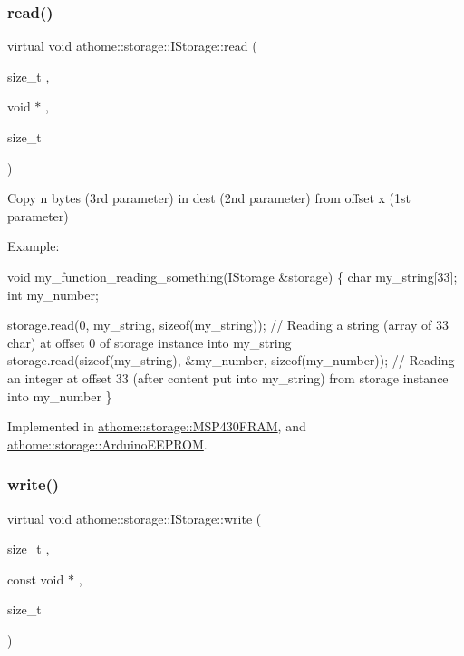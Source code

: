 \subsubsection{\texorpdfstring{read()}{read()}}
{\footnotesize\ttfamily virtual void athome\+::storage\+::\+I\+Storage\+::read (\begin{DoxyParamCaption}\item[{size\+\_\+t}]{,  }\item[{void $\ast$}]{,  }\item[{size\+\_\+t}]{ }\end{DoxyParamCaption})\hspace{0.3cm}{\ttfamily [pure virtual]}}

Copy n bytes (3rd parameter) in dest (2nd parameter) from offset x (1st parameter)

Example\+:


\begin{DoxyCode}
\textcolor{keywordtype}{void} my\_function\_reading\_something(IStorage &storage) \{
  \textcolor{keywordtype}{char} my\_string[33];
  \textcolor{keywordtype}{int} my\_number;

  storage.read(0, my\_string, \textcolor{keyword}{sizeof}(my\_string)); \textcolor{comment}{// Reading a string (array}
of 33 char) at offset 0 of storage instance into my\_string
  storage.read(\textcolor{keyword}{sizeof}(my\_string), &my\_number, \textcolor{keyword}{sizeof}(my\_number)); \textcolor{comment}{//}
Reading an integer at offset 33 (after content put into my\_string) from
storage instance into my\_number
\}
\end{DoxyCode}
 

Implemented in \mbox{\hyperlink{classathome_1_1storage_1_1_m_s_p430_f_r_a_m_a3a00a26565491d08d26f505930453fb7}{athome\+::storage\+::\+M\+S\+P430\+F\+R\+AM}}, and \mbox{\hyperlink{classathome_1_1storage_1_1_arduino_e_e_p_r_o_m_a853674189981dd3395ea76911d2eb1a0}{athome\+::storage\+::\+Arduino\+E\+E\+P\+R\+OM}}.

\mbox{\label{classathome_1_1storage_1_1_i_storage_a1017bb6ad438313b98197893954e52f1}} 
\subsubsection{\texorpdfstring{write()}{write()}}
{\footnotesize\ttfamily virtual void athome\+::storage\+::\+I\+Storage\+::write (\begin{DoxyParamCaption}\item[{size\+\_\+t}]{,  }\item[{const void $\ast$}]{,  }\item[{size\+\_\+t}]{ }\end{DoxyParamCaption})\hspace{0.3cm}{\ttfamily [pure virtual]}}


